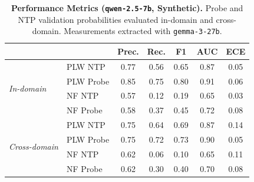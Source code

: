 \begin{table}[ht]
\centering
\begin{tabular}{ll ccccc}
\toprule
& & Prec. & Rec. & F1 & AUC & ECE \\
\midrule
\multirow{4}{*}{\textit{In-domain}}
& PLW NTP & 0.77 & 0.56 & 0.65 & 0.87 & 0.05 \\
& PLW Probe & 0.85 & 0.75 & 0.80 & 0.91 & 0.06 \\
& NF NTP & 0.57 & 0.12 & 0.19 & 0.65 & 0.03 \\
& NF Probe & 0.58 & 0.37 & 0.45 & 0.72 & 0.08 \\
\midrule
\multirow{4}{*}{\textit{Cross-domain}}
& PLW NTP & 0.75 & 0.64 & 0.69 & 0.87 & 0.14 \\
& PLW Probe & 0.75 & 0.72 & 0.73 & 0.90 & 0.05 \\
& NF NTP & 0.62 & 0.06 & 0.10 & 0.65 & 0.11 \\
& NF Probe & 0.62 & 0.30 & 0.40 & 0.70 & 0.08 \\
\bottomrule
\end{tabular}
\caption{\textbf{Performance Metrics (\texttt{qwen-2.5-7b}, Synthetic).} Probe and NTP validation probabilities evaluated in-domain and cross-domain. Measurements extracted with \texttt{gemma-3-27b}.}
\label{tab:qwen-2.5-7b-gemma-3-27b-head-syn}
\end{table}
